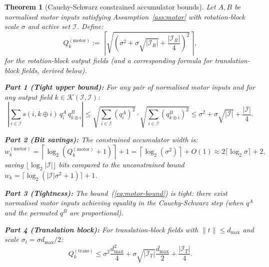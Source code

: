 \documentclass[11pt,a4paper]{article}
\theoremstyle{definition}
\theoremstyle{plain}
\newtheorem{theorem}{Theorem}[section]
\theoremstyle{remark}
\begin{document}
\begin{theorem}[Cauchy-Schwarz constrained accumulator bounds]
\label{thm:constrained}
Let $A,B$ be normalised motor inputs satisfying Assumption~\ref{ass:motor}
with rotation-block scale $\sigma$ and active set $\mathcal{I}$.
Define:
\begin{equation}\label{eq:Qmotor}
  Q_k^{(\mathrm{motor})} :=
  \left\lceil\sqrt{\left(\sigma^2+\sigma\sqrt{|\mathcal{I}_R|}+\frac{|\mathcal{I}_R|}{4}\right)^2}
  \right\rceil,
\end{equation}
for the rotation-block output fields (and a corresponding formula for
translation-block fields, derived below).

\textbf{Part 1 (Tight upper bound):}
For any pair of normalised motor inputs and for any output field
$k\in\mathcal{K}(\mathcal{I},\mathcal{I})$:
\begin{equation}\label{eq:motor-bound}
  \left|\sum_{i\in\mathcal{I}} s(i,k\oplus i)\,q_i^A\,q_{k\oplus i}^B\right|
  \le \sqrt{\sum_{i\in\mathcal{I}}(q_i^A)^2}\cdot\sqrt{\sum_{i\in\mathcal{I}}(q_{k\oplus i}^B)^2}
  \le \sigma^2 + \sigma\sqrt{|\mathcal{I}|} + \frac{|\mathcal{I}|}{4}.
\end{equation}

\textbf{Part 2 (Bit savings):}
The constrained accumulator width is:
\begin{equation}\label{eq:motor-bits}
  w_k^{(\mathrm{motor})} = \left\lceil\log_2\!\left(Q_k^{(\mathrm{motor})}+1\right)\right\rceil+1
  = \left\lceil\log_2(\sigma^2)\right\rceil + O(1)
  \approx 2\lceil\log_2\sigma\rceil+2,
\end{equation}
saving $\lfloor\log_2|\mathcal{I}|\rfloor$ bits compared to the
unconstrained bound $w_k=\lceil\log_2(|\mathcal{I}|\sigma^2+1)\rceil+1$.

\textbf{Part 3 (Tightness):}
The bound~(\ref{eq:motor-bound}) is tight: there exist normalised motor
inputs achieving equality in the Cauchy-Schwarz step (when $q^A$ and
the permuted $q^B$ are proportional).

\textbf{Part 4 (Translation block):}
For translation-block fields with $\|t\|\le d_{\max}$ and scale
$\sigma_t=\sigma d_{\max}/2$:
\begin{equation}\label{eq:trans-bound}
  Q_k^{(\mathrm{trans})} \le \sigma^2\frac{d_{\max}^2}{4}
  + \sigma\sqrt{|\mathcal{I}_T|}\frac{d_{\max}}{2} + \frac{|\mathcal{I}_T|}{4}.
\end{equation}
\end{theorem}
\end{document}
